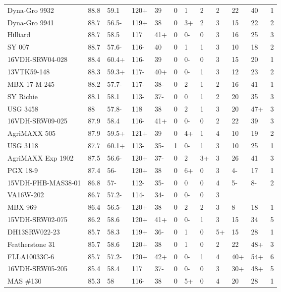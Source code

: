 \documentclass[12pt, letterpaper]{article}
\begin{document}
\begin{landscape}
\begin{ThreePartTable}
\begin{longtable}{llllllllllll}
  Dyna-Gro 9932 & 88.8 & 59.1 & 120+ & 39 & 0 & 1 & 2 & 2 & 22 & 40 & 1 \\ 
  Dyna-Gro 9941 & 88.7 & 56.5- & 119+ & 38 & 0 & 3+ & 2 & 3 & 15 & 22 & 2 \\ 
  Hilliard & 88.7 & 58.5 & 117 & 41+ & 0 & 0- & 0 & 3 & 16 & 25 & 3 \\ 
  SY 007 & 88.7 & 57.6- & 116- & 40 & 0 & 1 & 1 & 3 & 10 & 18 & 2 \\ 
  16VDH-SRW04-028 & 88.4 & 60.4+ & 116- & 39 & 0 & 0- & 0 & 3 & 15 & 20 & 1 \\ 
  13VTK59-148 & 88.3 & 59.3+ & 117- & 40+ & 0 & 0- & 1 & 3 & 12 & 23 & 2 \\ 
  MBX 17-M-245 & 88.2 & 57.7- & 117- & 38- & 0 & 2 & 1 & 2 & 16 & 41 & 1 \\ 
  SY Richie & 88.1 & 58.1 & 113- & 37- & 0 & 0 & 1 & 2 & 20 & 35 & 3 \\ 
  USG 3458 & 88 & 57.8- & 118 & 38 & 0 & 2 & 1 & 3 & 20 & 47+ & 3 \\ 
  16VDH-SRW09-025 & 87.9 & 58.4 & 116- & 41+ & 0 & 0- & 0 & 2 & 22 & 39 & 3 \\ 
  AgriMAXX 505 & 87.9 & 59.5+ & 121+ & 39 & 0 & 4+ & 1 & 4 & 10 & 19 & 2 \\ 
  USG 3118 & 87.7 & 60.1+ & 113- & 35- & 1 & 0- & 1 & 3 & 10 & 25 & 1 \\ 
  AgriMAXX Exp 1902 & 87.5 & 56.6- & 120+ & 37- & 0 & 2 & 3+ & 3 & 26 & 41 & 3 \\ 
  PGX 18-9 & 87.4 & 56- & 120+ & 38 & 0 & 6+ & 0 & 3 & 4- & 17 & 1 \\ 
  15VDH-FHB-MAS38-01 & 86.8 & 57- & 112- & 35- & 0 & 0 & 0 & 4 & 5- & 8- & 2 \\ 
  VA16W-202 & 86.7 & 57.2- & 114- & 34- & 0 & 0- & 0 & 3 &  &  &  \\ 
  MBX 969 & 86.4 & 56.5- & 120+ & 38 & 0 & 2 & 2 & 3 & 8 & 18 & 1 \\ 
  15VDH-SRW02-075 & 86.2 & 58.6 & 120+ & 41+ & 0 & 0- & 1 & 3 & 15 & 34 & 5 \\ 
  DH13SRW022-23 & 85.7 & 58.3 & 119+ & 36- & 0 & 1 & 0 & 5+ & 15 & 28 & 1 \\ 
  Featherstone 31 & 85.7 & 58.6 & 120+ & 38 & 0 & 1 & 0 & 2 & 22 & 48+ & 3 \\ 
  FLLA10033C-6 & 85.7 & 57.2- & 120+ & 42+ & 0 & 0- & 1 & 4 & 40+ & 54+ & 6 \\ 
  16VDH-SRW05-205 & 85.4 & 58.4 & 117 & 37- & 0 & 0- & 0 & 3 & 30+ & 48+ & 5 \\ 
  MAS \#130 & 85.3 & 58 & 116- & 38 & 0 & 5+ & 0 & 4 & 20 & 28 & 1 \\ 

\end{longtable}
\end{ThreePartTable}
\end{landscape}
\end{document}
